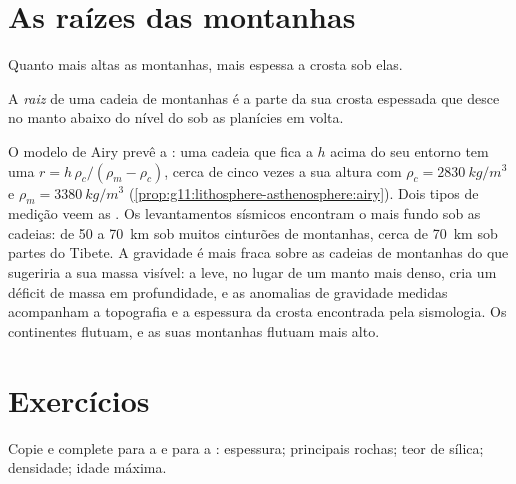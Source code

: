 \section{As raízes das montanhas}

Quanto mais altas as montanhas, mais espessa a crosta sob elas.

\begin{definition}\label{def:g12:continental-crust:root}
A \emph{raiz} de uma cadeia de
montanhas é a parte da sua crosta espessada que desce no manto abaixo do
nível do  sob as planícies em volta.
\end{definition}

O modelo de Airy prevê a : uma cadeia que fica a $h$ acima do seu
entorno tem uma  $r = h\,\rho_c/(\rho_m - \rho_c)$, cerca de cinco vezes
a sua altura com $\rho_c = \qty{2830}{kg/m^3}$ e $\rho_m =
\qty{3380}{kg/m^3}$ (\cref{prop:g11:lithosphere-asthenosphere:airy}). Dois
tipos de medição veem as . Os levantamentos sísmicos encontram o 
mais fundo sob as cadeias: de 50 a \qty{70}{km} sob muitos cinturões de
montanhas, cerca de \qty{70}{km} sob partes do Tibete. A gravidade é mais
fraca sobre as cadeias de montanhas do que sugeriria a sua massa visível: a
 leve, no lugar de um manto mais denso, cria um déficit de massa em
profundidade, e as anomalias de gravidade medidas acompanham a topografia e
a espessura da crosta encontrada pela sismologia. Os continentes flutuam, e
as suas montanhas flutuam mais alto.

\section{Exercícios}

\begin{exercise}[$\star$]\label{exo:g12:continental-crust:1}
Copie e complete para a  e para a :
espessura; principais rochas; teor de sílica; densidade; idade máxima.
\end{exercise}

